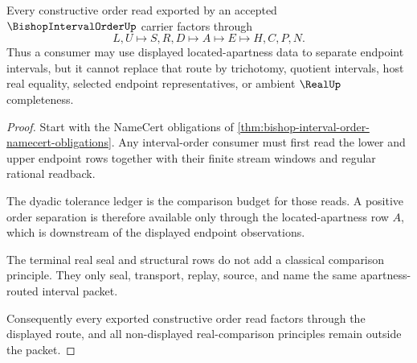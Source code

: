 \begin{theorem}
\label{thm:bishop-interval-order-apartness-route}
Every constructive order read exported by an accepted $\BishopIntervalOrderUp$ carrier factors through
$$
L,U \longmapsto S,R,D \longmapsto A \longmapsto E \longmapsto H,C,P,N .
$$
Thus a consumer may use displayed located-apartness data to separate endpoint intervals, but it cannot replace that route by trichotomy, quotient intervals, host real equality, selected endpoint representatives, or ambient $\RealUp$ completeness.
\end{theorem}
\begin{proof}
Start with the NameCert obligations of \autoref{thm:bishop-interval-order-namecert-obligations}. Any interval-order consumer must first read the lower and upper endpoint rows together with their finite stream windows and regular rational readback.

The dyadic tolerance ledger is the comparison budget for those reads. A positive order separation is therefore available only through the located-apartness row $A$, which is downstream of the displayed endpoint observations.

The terminal real seal and structural rows do not add a classical comparison principle. They only seal, transport, replay, source, and name the same apartness-routed interval packet.

Consequently every exported constructive order read factors through the displayed route, and all non-displayed real-comparison principles remain outside the packet.
\end{proof}




